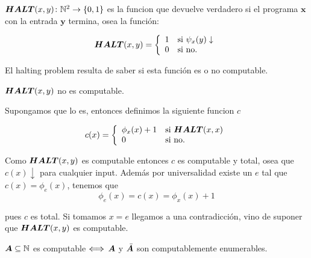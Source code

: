 \documentclass[leqno, 12pt, twoside,letterpaper]{book}
\begin{document}
\begin{solucion}
\noindent $\bm{HALT}(x, y) \colon \mathbb{N}^2 \to \{0, 1\} $ es la funcion que
    devuelve verdadero si el programa $\bm{x}$ con la entrada $\bm{y}$ termina,
    osea la función:

	\[ \bm{HALT}(x, y) = \left\{ \begin{array}{ll} 1 & \mbox{si } \psi_{x}(y) \downarrow \\ 0 & \mbox{} \mbox{si no.} \end{array} \right.\]

\noindent El halting problem resulta de saber si esta función es o no computable. \\

\begin{teo}{} $\bm{HALT}(x, y)$ no es computable.
\end{teo}

\begin{dem}
	Supongamos que lo es, entonces definimos la siguiente funcion $c$

	\[ c(x) = \left\{ \begin{array}{ll} \phi_x{(x)} + 1 & \mbox{si } \bm{HALT}(x, x) \\ 0 & \mbox{} \mbox{si no.} \end{array} \right. \]

	\noindent Como $\bm{HALT}(x, y)$ es computable entonces $c$ es computable y total, osea que $c(x) \downarrow$ para cualquier input. Además por universalidad existe un $e$ tal que $c(x) = \phi_{e}(x)$, tenemos que
	\[ \phi_{e}(x) = c(x) = \phi_{x}(x) + 1 \]

	\noindent pues $c$ es total. Si tomamos $x = e$ llegamos a una contradicción, vino de suponer que $\bm{HALT}(x, y)$ es computable.
\end{dem}
\end{solucion}

\begin{ej}{2}
    $\bm{A} \subseteq \mathbb{N}$ es computable $\Longleftrightarrow$ $\bm{A}$ y $\bar{\bm{A}}$ son
    computablemente enumerables.
\end{ej}
\end{document}
